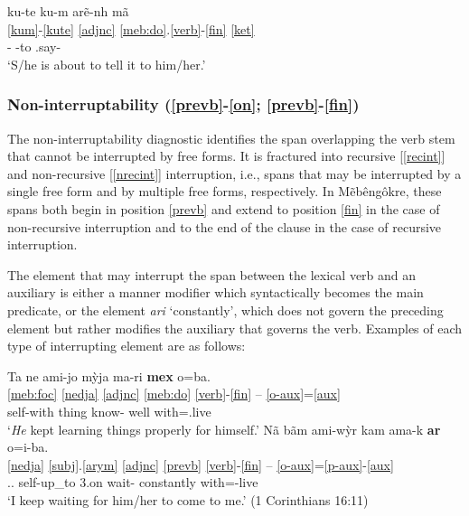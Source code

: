 \documentclass[output=paper]{langscibook}
\begin{document}
    \ex \glll ku-te ku-m arẽ-nh mã\\
          \ref{kum}-\ref{kute} \ref{adjnc} \ref{meb:do}.\ref{verb}-\ref{fin} \ref{ket}\\
        \Third\Acc-\Erg{} \Third\Acc{}-to \Third.say-\Nfin{} \Prosp\\
      \glt `S/he is about to tell it to him/her.'
    \z
\z


\subsubsection{Non-interruptability (\ref{prevb}-\ref{on}; \ref{prevb}-\ref{fin})}
The non-interruptability diagnostic identifies the span overlapping the verb stem that cannot be interrupted by free forms. It is fractured into recursive [\ref{recint}] and non-recursive [\ref{nrecint}] interruption, i.e., spans that may be interrupted by a single free form and by multiple free forms, respectively. In Mẽbêngôkre, these spans both begin in position \ref{prevb} and extend to position \ref{fin} in the case of non-recursive interruption and to the end of the clause in the case of recursive interruption.

The element that may interrupt the span between the lexical verb and an auxiliary is either a manner modifier which syntactically becomes the main predicate, or the element {\em ari} `constantly', which does not govern the preceding element but rather modifies the auxiliary that governs the verb. Examples of each type of interrupting element are as follows:


\ea\glll Ta ne ami-jo mỳja ma-ri {\bfseries mex} o=ba.\\
       \ref{meb:foc} \ref{nedja} \ref{adjnc} \ref{meb:do} \ref{verb}-\ref{fin} -- \ref{o-aux}=\ref{aux}\\
       \Third\Emph{} \Nfut{} self-with thing know-\Nfin{} well with=\Third.live\\
    \glt `{\em He} kept learning things properly for himself.'
  \ex\glll Nã bãm ami-wỳr kam ama-k {\bfseries ar} o=i-ba.\\
       \ref{nedja} \ref{subj}.\ref{arym} \ref{adjnc} \ref{prevb} \ref{verb}-\ref{fin} -- \ref{o-aux}=\ref{p-aux}-\ref{aux}\\
       \Prs{} \First.\Nom.\Prs{} self-up\_to 3.on wait-\Nfin{} constantly with=\First-live\\
    \glt `I keep waiting for him/her to come to me.' (1 Corinthians 16:11)
\z
\end{document}
